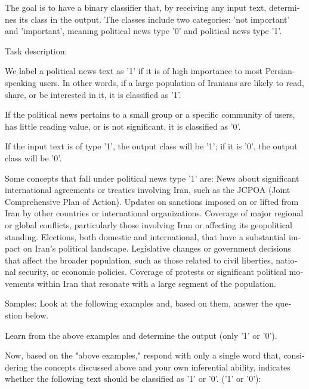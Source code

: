 \vspace{5pt}
\begin{scriptsize}
\begin{itshape}
\begin{latin}
\LTR
The goal is to have a binary classifier that, by receiving any input text, determines its class in the output. The classes include two categories: 'not important' and 'important', meaning political news type '0' and political news type '1'.

Task description:

We label a political news text as '1' if it is of high importance to most Persian-speaking users. In other words, if a large population of Iranians are likely to read, share, or be interested in it, it is classified as '1'.

If the political news pertains to a small group or a specific community of users, has little reading value, or is not significant, it is classified as '0'.

If the input text is of type '1', the output class will be '1'; if it is '0', the output class will be '0'.

Some concepts that fall under political news type '1' are:
News about significant international agreements or treaties involving Iran, such as the JCPOA (Joint Comprehensive Plan of Action).
Updates on sanctions imposed on or lifted from Iran by other countries or international organizations.
Coverage of major regional or global conflicts, particularly those involving Iran or affecting its geopolitical standing.
Elections, both domestic and international, that have a substantial impact on Iran’s political landscape.
Legislative changes or government decisions that affect the broader population, such as those related to civil liberties, national security, or economic policies.
Coverage of protests or significant political movements within Iran that resonate with a large segment of the population.

Samples: Look at the following examples and, based on them, answer the question below.

Learn from the above examples and determine the output (only '1' or '0').

Now, based on the "above examples," respond with only a single word that, considering the concepts discussed above and your own inferential ability, indicates whether the following text should be classified as '1' or '0'. ('1' or '0'):
\RTL
\end{latin}
\end{itshape}
\end{scriptsize}
\vspace{5pt}

